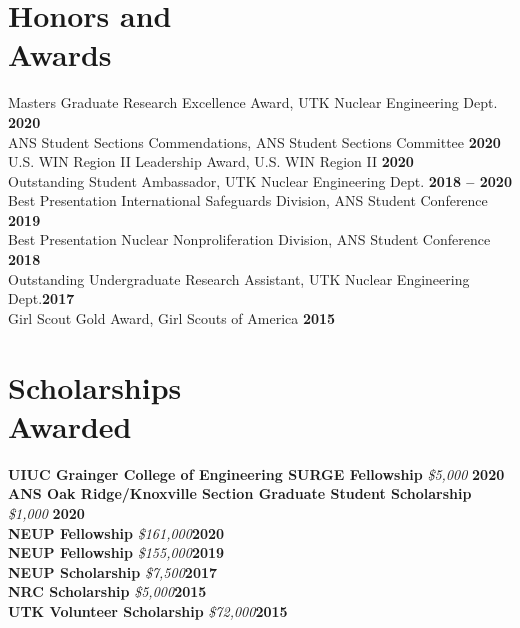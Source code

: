 \documentclass[margin,line]{resume}
\begin{document}
\begin{resume}
    \section{\mysidestyle Honors and\\Awards}
                Masters Graduate Research Excellence Award, UTK Nuclear Engineering Dept. \hfill \textbf{2020}\vspace{.5mm}\\%
                ANS Student Sections Commendations, ANS Student Sections Committee \hfill \textbf{2020}\vspace{.5mm}\\%
                U.S. WIN Region II Leadership Award, U.S. WIN Region II \hfill \textbf{2020}\vspace{.5mm}\\%
                Outstanding Student Ambassador, UTK Nuclear Engineering Dept. \hfill \textbf{2018 -- 2020}\vspace{.5mm}\\%
                Best Presentation International Safeguards Division, ANS Student Conference \hfill \textbf{2019}\vspace{0.5mm}\\%
                Best Presentation Nuclear Nonproliferation Division, ANS Student Conference \hfill \textbf{2018}\vspace{0.5mm}\\%
                Outstanding Undergraduate Research Assistant, UTK Nuclear Engineering Dept.\hfill \textbf{2017}\vspace{.5mm}\\%
                Girl Scout Gold Award, Girl Scouts of America \hfill \textbf{2015}\vspace{.5mm}\\%

    \section{\mysidestyle Scholarships\\Awarded}
    \textbf{UIUC Grainger College of Engineering SURGE Fellowship} \textsl{\$5,000} \hfill \textbf{2020}\\
    \textbf{ANS Oak Ridge/Knoxville Section Graduate Student Scholarship} \textsl{\$1,000} \hfill \textbf{2020}\\
    \textbf{NEUP Fellowship} \textsl{\$161,000}\hfill \textbf{2020}\\
    \textbf{NEUP Fellowship} \textsl{\$155,000}\hfill \textbf{2019}\\
    \textbf{NEUP Scholarship} \textsl{\$7,500}\hfill \textbf{2017}\\
    \textbf{NRC Scholarship} \textsl{\$5,000}\hfill \textbf{2015}\\
    \textbf{UTK Volunteer Scholarship} \textsl{\$72,000}\hfill \textbf{2015}\\


\end{resume}
\end{document}
